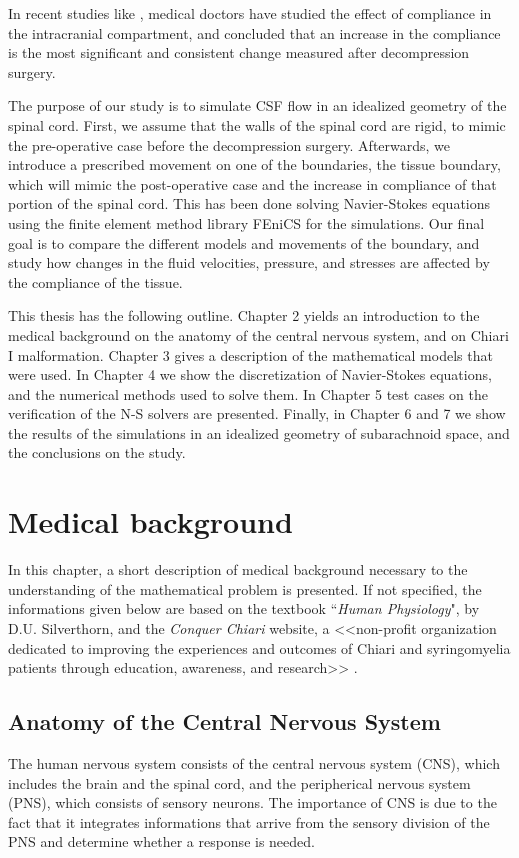 \documentclass[a4paper,11pt,oneside]{book}
\begin{document}
In recent studies like \cite{sivarama}, medical doctors have studied the effect of compliance in the intracranial compartment, and concluded that an increase in the compliance is the most significant and consistent change measured after decompression surgery. 

The purpose of our study is to simulate CSF flow in an idealized geometry of the spinal cord. First, we assume that the walls of the spinal cord are rigid, to mimic the pre-operative case before the decompression surgery.  Afterwards, we introduce a prescribed movement on one of the boundaries, the tissue boundary, which will mimic the post-operative case and the increase in compliance of that portion of the spinal cord. This has been done solving Navier-Stokes equations using the finite element method library FEniCS for the simulations. Our final goal is to compare the different models and movements of the boundary, and study how changes in the fluid velocities, pressure, and stresses are affected by the compliance of the tissue. 

This thesis has the following outline. Chapter 2 yields an introduction to the medical background on the anatomy of the central nervous system, and on Chiari I malformation. Chapter 3 gives a description of the mathematical models that were used. In Chapter 4 we show the discretization of Navier-Stokes equations, and the numerical methods used to solve them. In Chapter 5 test cases on the verification of the N-S solvers are presented. Finally, in Chapter 6 and 7 we show the results of the simulations in an idealized geometry of subarachnoid space, and the conclusions on the study.

\chapter{Medical background}
In this chapter, a short description of medical background necessary to the understanding of the mathematical problem is presented. If not specified, the informations given below are based on the textbook ``\emph{Human Physiology}", by D.U. Silverthorn, and the \emph{Conquer Chiari} website, a <<non-profit organization dedicated to improving the experiences and outcomes of Chiari and syringomyelia patients through education, awareness, and research>>  \cite{chiari}.

\section{Anatomy of the Central Nervous System}
The human nervous system consists of the central nervous system (CNS), which includes the brain and the spinal cord, and the peripherical nervous system (PNS), which consists of sensory neurons.  The importance of CNS is due to the fact that it integrates informations that arrive from the sensory division of the PNS and determine whether a response is needed. 
\end{document}
